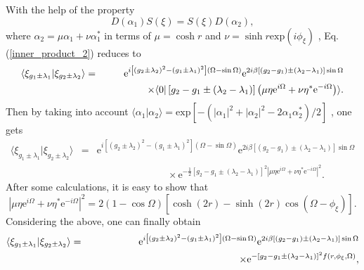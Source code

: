 With the help of the property 
\begin{equation}
D\left(\alpha_{1}\right)S\left(\xi\right)=S\left(\xi\right)D\left(\alpha_{2}\right),
\end{equation}
where $\alpha_{2}=\mu\alpha_{1}+\nu\alpha_{1}^{*}$ in terms of $\mu=\cosh r$ and $\nu=\sinh r \textrm{exp}\left(i\phi_{\xi}\right)$ \cite{orszag2016quantum}, Eq. (\ref{inner_product_2}) reduces to 
\begin{eqnarray}
\langle \xi_{g_{1}\pm\lambda_{1}}|\xi_{g_{2}\pm\lambda_{2}}\rangle &=&\textrm{e}^{i\left[\left(g_{2}\pm\lambda_{2}\right)^{2}-\left(g_{1}\pm\lambda_{1}\right)^{2}\right]\left(\Omega-\sin \Omega\right)}\textrm{e}^{2i\beta\left[\left(g_{2}-g_{1}\right)\pm\left(\lambda_{2}-\lambda_{1}\right)\right]\sin\Omega}\nonumber\\
                                                                   &&\hspace{1.5cm}\times\langle 0|\left[g_{2}-g_{1}\pm\left(\lambda_{2}-\lambda_{1}\right)\right]\left(\mu\eta\textrm{e}^{i\Omega}+\nu\eta^{*}\textrm{e}^{-i\Omega}\right)\rangle.
\end{eqnarray}
Then by taking into account $\langle \alpha_{1}|\alpha_{2}\rangle=\textrm{exp}\left[-\left(|\alpha_{1}|^{2}+|\alpha_{2}|^{2}-2\alpha_{1}\alpha_{2}^{*}\right)/2\right]$ \cite{orszag2016quantum}, one gets
\begin{eqnarray}
\langle \xi_{g_{1}\pm\lambda_{1}}|\xi_{g_{2}\pm\lambda_{2}}\rangle &=&\textrm{e}^{i\left[\left(g_{2}\pm\lambda_{2}\right)^{2}-\left(g_{1}\pm\lambda_{1}\right)^{2}\right]\left(\Omega-\sin \Omega\right)}\textrm{e}^{2i\beta\left[\left(g_{2}-g_{1}\right)\pm\left(\lambda_{2}-\lambda_{1}\right)\right]\sin\Omega}\nonumber\\
                                                                   &&\hspace{3cm}\times\textrm{e}^{-\frac{1}{2}\left[g_{2}-g_{1}\pm\left(\lambda_{2}-\lambda_{1}\right)\right]^{2}|\mu\eta\textrm{e}^{i\Omega}+\nu\eta^{*}\textrm{e}^{-i\Omega}|^{2}}.
\end{eqnarray}
After some calculations, it is easy to show that
\begin{equation}
|\mu\eta\textrm{e}^{i\Omega}
+\nu\eta^{*}\textrm{e}^{-i\Omega}|^{2}
=2\left(1-\cos\Omega\right)
\left[\cosh\left(2r\right)-\sinh\left(2r\right)
\cos\left(\Omega-\phi_{\xi}\right)\right].
\end{equation}
Considering the above, one can finally obtain
\begin{eqnarray}
\langle \xi_{g_{1}\pm\lambda_{1}}|\xi_{g_{2}\pm\lambda_{2}}\rangle &=&\textrm{e}^{i\left[\left(g_{2}\pm\lambda_{2}\right)^{2}-\left(g_{1}\pm\lambda_{1}\right)^{2}\right]\left(\Omega-\sin \Omega\right)}\textrm{e}^{2i\beta\left[\left(g_{2}-g_{1}\right)\pm\left(\lambda_{2}-\lambda_{1}\right)\right]\sin\Omega}\nonumber\\
                                                                   &&\hspace{5.3cm}\times\textrm{e}^{-\left[g_{2}-g_{1}\pm\left(\lambda_{2}-\lambda_{1}\right)\right]^{2}f\left(r,\phi_{\xi},\Omega\right)},
\end{eqnarray}

